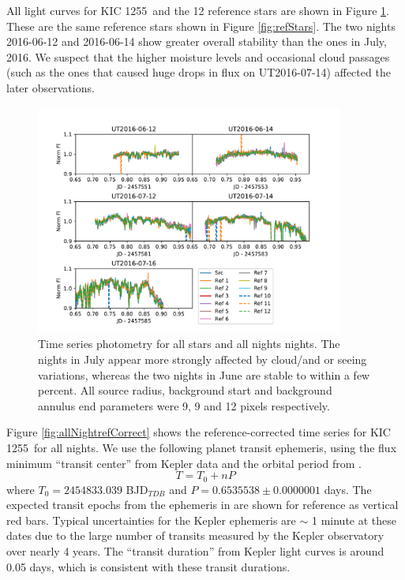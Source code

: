\documentclass[preprint]{aastex61}
\newcommand{\shStar}{KIC 1255}
\begin{document}
All light curves for \shStar\ and the 12 reference stars are shown in Figure \ref{fig:allNightallStar}.
These are the same reference stars shown in Figure \ref{fig:refStars}.
The two nights 2016-06-12 and 2016-06-14 show greater overall stability than the ones in July, 2016.
We suspect that the higher moisture levels and occasional cloud passages (such as the ones that caused huge drops in flux on UT2016-07-14) affected the later observations.

\begin{figure}
\begin{centering}
\includegraphics[width=0.9\textwidth]{images/all_kic1255_phot/all_kic1255_allstar.pdf}
\caption{Time series photometry for all stars and all nights nights.
The nights in July appear more strongly affected by cloud/and or seeing variations, whereas the two nights in June are stable to within a few percent.
All source radius, background start and background annulus end parameters were 9, 9 and 12 pixels respectively.}\label{fig:allNightallStar}
\end{centering}
\end{figure}

Figure \ref{fig:allNightrefCorrect} shows the reference-corrected time series for \shStar\ for all nights.
We use the following planet transit ephemeris, using the flux minimum ``transit center'' from Kepler data \citep{schlawin2016kic1255} and the orbital period from \citet{vanWerkhoven2014}.
\begin{equation}
T = T_0 + n P
\end{equation}
where $T_0 = 2454833.039$ BJD$_{TDB}$ and $P = 0.653 553 8 \pm 0.000 000 1$ days.
The expected transit epochs from the ephemeris in \citep{vanWerkhoven2014} are shown for reference as vertical red bars.
Typical uncertainties for the Kepler ephemeris are $\sim$ 1 minute at these dates due to the large number of transits measured by the Kepler observatory over nearly 4 years.
The ``transit duration'' from Kepler light curves is around 0.05 days, which is consistent with these transit durations.
\end{document}
